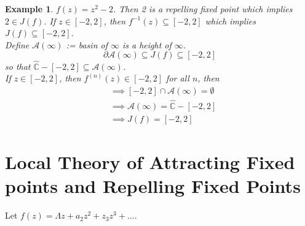 \documentclass[a4paper, 11pt]{book}
\newtheorem*{example}{Example}
\theoremstyle{definition}
\theoremstyle{remark}
\begin{document}
    \begin{example}
        $f(z) = z^2 -2$. Then 2 is a repelling fixed point which implies $2\in J(f)$. If $z\in[-2,2]$, then $f^{-1}(z)\subseteq [-2,2]$ which
        implies $J(f)\subseteq [-2,2]$.\\

        Define $\mathcal{A}(\infty)$ := basin of $\infty$ is a height of $\infty$.
        \[ \partial{\mathcal{A}(\infty)} \subseteq J(f) \subseteq [-2,2] \]
        so that $\hat{\mathbb{C}}-[-2,2]\subseteq \mathcal{A}(\infty)$.\\

        If $z\in[-2,2]$, then $f^{(n)}(z) \in [-2,2]$ for all $n$, then
        \begin{align*}
            &\implies [-2,2]\cap \mathcal{A}(\infty) = \emptyset \\
            &\implies \mathcal{A}(\infty) = \hat{\mathbb{C}}-[-2,2] \\
            &\implies J(f) = [-2,2]
        \end{align*}
    \end{example}

    \section{Local Theory of Attracting Fixed points and Repelling Fixed Points}

    Let $f(z) = \Lambda z + a_2z^2 + z_3z^3 + \hdots$.
\end{document}
